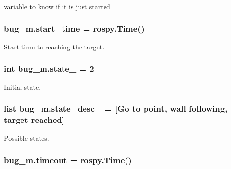 variable to know if it is just started 

\subsubsection[{\texorpdfstring{start\+\_\+time}{start_time}}]{\setlength{\rightskip}{0pt plus 5cm}bug\+\_\+m.\+start\+\_\+time = rospy.\+Time()}\hypertarget{namespacebug__m_ad89000edbe3340ac3fe8bd5bee368dec}{}\label{namespacebug__m_ad89000edbe3340ac3fe8bd5bee368dec}


Start time to reaching the target. 

\subsubsection[{\texorpdfstring{state\+\_\+}{state_}}]{\setlength{\rightskip}{0pt plus 5cm}int bug\+\_\+m.\+state\+\_\+ = 2}\hypertarget{namespacebug__m_a79dc362dff5bef439beacdd5c0c3b2f1}{}\label{namespacebug__m_a79dc362dff5bef439beacdd5c0c3b2f1}


Initial state. 

\subsubsection[{\texorpdfstring{state\+\_\+desc\+\_\+}{state_desc_}}]{\setlength{\rightskip}{0pt plus 5cm}list bug\+\_\+m.\+state\+\_\+desc\+\_\+ = \mbox{[}\textquotesingle{}Go to point\textquotesingle{}, \textquotesingle{}wall following\textquotesingle{}, \textquotesingle{}target reached\textquotesingle{}\mbox{]}}\hypertarget{namespacebug__m_ae70f71d3816862f72790fae7bfaa543b}{}\label{namespacebug__m_ae70f71d3816862f72790fae7bfaa543b}


Possible states. 

\subsubsection[{\texorpdfstring{timeout}{timeout}}]{\setlength{\rightskip}{0pt plus 5cm}bug\+\_\+m.\+timeout = rospy.\+Time()}\hypertarget{namespacebug__m_ad56f445349e05abe7f111b48e25d3ecb}{}\label{namespacebug__m_ad56f445349e05abe7f111b48e25d3ecb}



